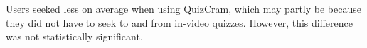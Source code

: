 \documentclass{sigchi}
\begin{document}


Users seeked less on average when using QuizCram, which may partly be because they did not have to seek to and from in-video quizzes. However, this difference was not statistically significant.




\end{document}
